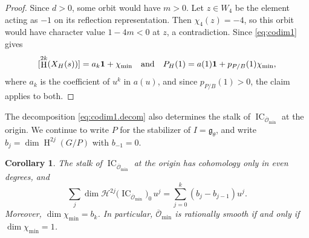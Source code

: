 \documentclass[11pt]{amsart}
\numberwithin{equation}{section}
\newtheorem{corollary}[theorem]{Corollary}
\theoremstyle{definition}
\def\and{\quad{\rm and}\quad}
\DeclareMathOperator{\coh}{\mathrm{H}}
\DeclareMathOperator{\IC}{\mathrm{IC}}
\def\cH{\mathcal {H}}
\def\fg{\mathfrak {g}}
\begin{document}
\begin{proof}
Since $d>0$, some orbit would have $m>0$.
Let $z\in W_4$ be the element acting as $-1$ on its reflection representation. Then $\chi_4(z)=-4$, so this orbit would have character value $1-4m<0$ at $z$, a contradiction.
Since \eqref{eq:codim1} gives
\[
[\coh^{2k}(X_H(s))]=a_k\mathbf1+\chi_{\min}
\and
P_H(1)=a(1)\mathbf1+p_{P/B}(1)\chi_{\min},
\]
where $a_k$ is the coefficient of $u^k$ in $a(u)$, and since $p_{P/B}(1)>0$, the claim applies to both.

\end{proof}

The decomposition \eqref{eq:codim1.decom} also determines the stalk of $\IC_{\overline{\mathcal O}_{\min}}$ at the origin.
We continue to write $P$ for the stabilizer of $I=\fg_\theta$, and write $b_j=\dim\coh^{2j}(G/P)$ with $b_{-1}=0$.

\begin{corollary}\label{cor:min.orbit.stalk}
The stalk of $\IC_{\overline{\mathcal O}_{\min}}$ at the origin has cohomology only in even degrees, and
\begin{equation}\label{eq:min.orbit}
\sum_j
\dim\cH^{2j}
\bigl(\IC_{\overline{\mathcal O}_{\min}}\bigr)_0\,u^j
=\sum_{j=0}^{k}(b_j-b_{j-1})u^j.
\end{equation}
Moreover, $\dim\chi_{\min}=b_k$. 
In particular, $\overline{\mathcal O}_{\min}$ is rationally smooth if and only if $\dim\chi_{\min}=1$.
\end{corollary}
\end{document}
